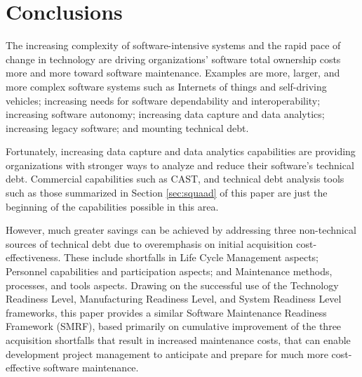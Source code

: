 \section{Conclusions}
\label{sec:conclusion}
The increasing complexity of software-intensive systems and the rapid pace of change in technology are driving organizations' software total ownership costs more and more toward software maintenance. Examples are more, larger, and more complex software systems such as Internets of things and self-driving vehicles; increasing needs for software dependability and interoperability; increasing software autonomy; increasing data capture and data analytics; increasing legacy software; and mounting technical debt.

Fortunately, increasing data capture and data analytics capabilities are  providing organizations with stronger ways to analyze and reduce their software's technical debt. Commercial capabilities such as CAST, and technical debt analysis tools such as those summarized in Section \ref{sec:squaad} of this paper are just the beginning of the capabilities possible in this area.

However, much greater savings can be achieved by addressing three non-technical sources of technical debt due to overemphasis  on initial acquisition cost-effectiveness. These include shortfalls  in Life Cycle Management aspects; Personnel capabilities and participation aspects; and Maintenance methods, processes, and tools aspects. Drawing on the successful use of the Technology Readiness Level, Manufacturing Readiness Level, and System Readiness Level frameworks, this paper provides a similar Software Maintenance Readiness Framework (SMRF), based primarily on cumulative improvement of the three acquisition shortfalls that result in increased maintenance costs, that can enable development project management to anticipate and prepare for much more cost-effective software maintenance.
